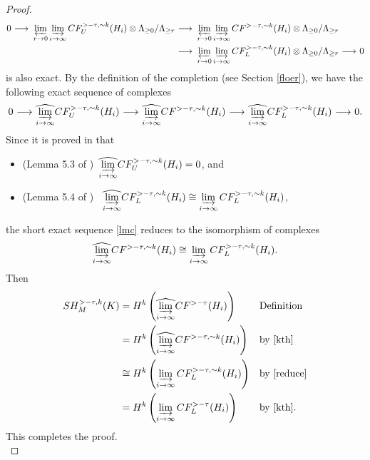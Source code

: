 \documentclass[12pt]{amsart}
\theoremstyle{definition}
\newcommand{\lr}{{\,\,\longrightarrow\,\,}}
\begin{document}
\begin{proof}
\begin{align*}
    0 \lr  \varprojlim_{r \to 0} \varinjlim_{i \to \infty}CF^{>-\tau,\sim k}_{U}(H_i) \otimes \Lambda_{\geq 0}/\Lambda_{\geq r} & \lr \varprojlim_{r \to 0}\varinjlim_{i \to \infty}CF^{>-\tau,\sim k}(H_i) \otimes \Lambda_{\geq 0}/\Lambda_{\geq r}\\ & \lr \varprojlim_{r \to 0}\varinjlim_{i \to \infty}CF^{>-\tau,\sim k}_{L}(H_i)\otimes \Lambda_{\geq 0}/\Lambda_{\geq r} \lr 0
\end{align*}
is also exact. By the definition of the completion (see Section \ref{floer}), we have the following exact sequence of complexes
\begin{align}\label{lmc}
    0 \lr  \widehat{\varinjlim_{i \to \infty}}CF^{>-\tau,\sim k}_{U}(H_i) \lr \widehat{\varinjlim_{i \to \infty}}CF^{>-\tau,\sim k}(H_i)\lr \widehat{\varinjlim_{i \to \infty}}CF^{>-\tau,\sim k}_{L}(H_i) \lr 0.
\end{align}
    Since it is proved in \cite{dgpz} that\vspace{0.2cm}
    \begin{itemize}
        \item (Lemma 5.3 of \cite{dgpz})\, $ \displaystyle\widehat{\varinjlim_{i \to \infty}}CF^{>-\tau,\sim k}_{U}(H_i) = 0$, and\vspace{0.2cm}
        
        \item (Lemma 5.4 of \cite{dgpz}) \, $\displaystyle \widehat{\varinjlim_{i \to \infty}}CF^{>-\tau,\sim k}_{L}(H_i) \cong \varinjlim_{i \to \infty}CF^{>-\tau,\sim k}_{L}(H_i)$,\\
    \end{itemize}
  the short exact sequence \eqref{lmc} reduces to the isomorphism of complexes
  \begin{align}\label{reduce}
      \widehat{\varinjlim_{i \to \infty}}CF^{>-\tau,\sim k}_{}(H_i) \cong \varinjlim_{i \to \infty}CF^{>-\tau,\sim k}_{L}(H_i).
  \end{align}
  Then
  \begin{align*}
      SH^{>-\tau,k}_M(K) &= H^k \left( \widehat{\varinjlim_{i \to \infty} }CF^{>-\tau}(H_i)  \right) &&\textrm{Definition}\\
      &= H^k \left( \widehat{\varinjlim_{i \to \infty} }CF^{>-\tau, \sim k}(H_i) \right)&&\textrm{by}\,\,\eqref{kth}\\
      &\cong H^k \left( \varinjlim_{i \to \infty} CF^{>-\tau, \sim k}_{L}(H_i) \right)&&\textrm{by}\,\,\eqref{reduce}\\
      &= H^k \left( \varinjlim_{i \to \infty} CF^{>-\tau}_{L}(H_i) \right) &&\textrm{by}\,\,\eqref{kth}.
  \end{align*}
   This completes the proof.\\ 
\end{proof}
\end{document}
